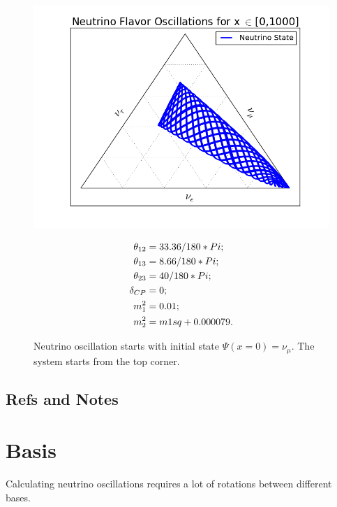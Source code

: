 \documentclass[letterpaper,12pt,english]{sphinxmanual}
\begin{document}
\begin{figure}[htbp]
\centering
\capstart

\includegraphics{1000-5.png}
\caption{Neutrino oscillation starts with initial state \(\Psi(x=0) = \nu_\mu\). The system starts from the top corner.}{\small \begin{gather}
\begin{split}\theta_{12} &= 33.36/180*Pi; \\
\theta_{13} &= 8.66/180 *Pi; \\
\theta_{23} &= 40/180*Pi;\\
\delta_{CP} &= 0;\\
m_1^2 &= 0.01;\\
m_2^2 &= m1sq + 0.000079.\end{split}\notag
\end{gather}}\end{figure}


\section{Refs and Notes}
\label{vacuum:refs-and-notes}

\chapter{Basis}
\label{basis::doc}\label{basis:basis}
Calculating neutrino oscillations requires a lot of rotations between different bases.
\end{document}
